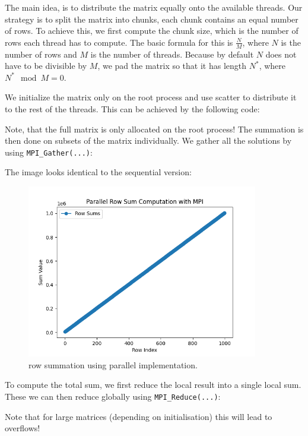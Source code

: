 \documentclass[a4paper,10pt]{article}
\begin{document}


The main idea, is to distribute the matrix equally onto the available threads.
Our strategy is to split the matrix into chunks, each chunk contains an equal number of rows.
To achieve this, we first compute the chunk size, which is the number of rows each thread has to compute.
The basic formula for this is $\frac{N}{M}$, where $N$ is the number of rows and $M$ is the number of threads.
Because by default $N$ does not have to be divisible by $M$, we pad the matrix so that it has length $N^*$, where $N^* \mod M = 0$.

We initialize the matrix only on the root process and use scatter to distribute it to the rest of the threads.
This can be achieved by the following code:

Note, that the full matrix is only allocated on the root process!
The summation is then done on subsets of the matrix individually.
We gather all the solutions by using \verb|MPI_Gather(...)|:


The image looks identical to the sequential version:
\begin{figure}[H]
  \centering
  \includegraphics[width=0.9\textwidth]{img/ex2_para}
  \caption{row summation using parallel implementation.}
  \label{fig:ex2_seq}
\end{figure}

To compute the total sum, we first reduce the local result into a single local sum.
These we can then reduce globally using \verb|MPI_Reduce(...)|:

Note that for large matrices (depending on initialisation) this will lead to overflows!
\end{document}
